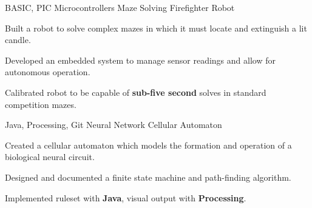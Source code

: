 
\begin{cventries}
  \cventry
    {BASIC, PIC Microcontrollers} %
    {Maze Solving Firefighter Robot \href{https://github.com/guhansiyer/firefighter-code}{\faGithub}} %
    {} %
    {} %
    {
      \begin{cvitems} %
        \item {Built a robot to solve complex mazes in which it must locate and extinguish a lit candle.}
	  \item {Developed an embedded system to manage sensor readings and allow for autonomous operation.}
        \item {Calibrated robot to be capable of \textbf{sub-five second} solves in standard competition mazes.}
      \end{cvitems}
    }
    
  \cventry
    {Java, Processing, Git} %
    {Neural Network Cellular Automaton
    \href{https://github.com/guhansiyer/neuron-model}{\faGithub}} %
    {} %
    {} %
    {
      \begin{cvitems} %
        \item {Created a cellular automaton which models the formation and operation of a biological neural circuit.}
        \item {Designed and documented a finite state machine and path-finding algorithm.}
        \item{Implemented ruleset with \textbf{Java}, visual output with \textbf{Processing}.}
      \end{cvitems}
    }
    
\end{cventries}